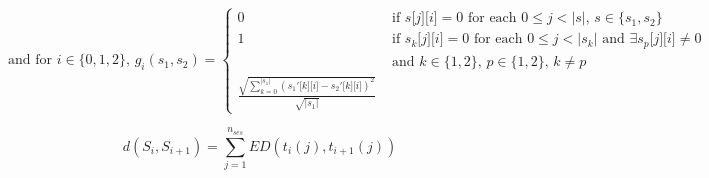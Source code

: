 \[\text{and for } i  \in \{0,1,2\}\text{, } g_i(\textit{s}_1,\textit{s}_2) = \left\{
  \begin{array}{ll}
    0 & \text{ if } \textit{s}\lbrack j \rbrack\lbrack i \rbrack=0 \text{ for each } 0 \leqslant j < |\textit{s}|\text{, } \textit{s} \in \{\textit{s}_1,\textit{s}_2\}\\
    1 & \text{ if } \textit{s}_k\lbrack j \rbrack\lbrack i \rbrack=0 \text{ for each } 0 \leqslant j < |\textit{s}_k| \text{ and } \exists \textit{s}_p\lbrack j \rbrack\lbrack i \rbrack \neq 0\\
      & \text{ and } k \in \{1,2\} \text{, } p \in \{1,2\} \text{, } k \neq p\\
	\frac{\sqrt{\displaystyle\sum_{k=0}^{\lvert\textit{s}_1\lvert} (\textit{s}_1'\lbrack k \rbrack\lbrack i \rbrack - \textit{s}_2'\lbrack k \rbrack\lbrack i \rbrack)^2}}{\sqrt{\lvert\textit{s}_1\rvert}}
  \end{array}
\right.
\]

$$ d(\textit{S}_i,\textit{S}_{i+1}) = \displaystyle\sum_{j=1}^{n_{ses}} ED(\textit{t}_i (j), \textit{t}_{i+1} (j))$$


